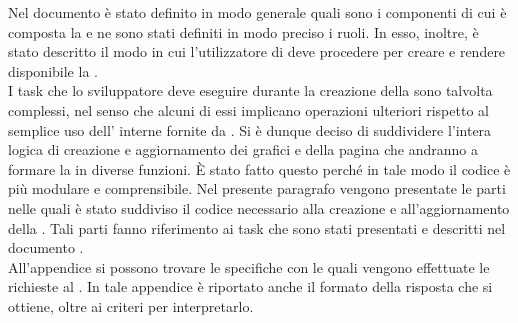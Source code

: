     Nel documento  è stato definito in modo generale quali sono i componenti di cui è composta la  e ne sono stati definiti in modo preciso i ruoli. In esso, inoltre, è stato descritto il modo in cui l'utilizzatore di  deve procedere per creare e rendere disponibile la .\\
    I task che lo sviluppatore deve eseguire durante la creazione della  sono talvolta complessi, nel senso che alcuni di essi implicano operazioni ulteriori rispetto al semplice uso dell'  interne fornite da . Si è dunque deciso di suddividere l'intera logica di creazione e aggiornamento dei grafici e della pagina che andranno a formare la  in diverse funzioni. È stato fatto questo perché in tale modo il codice è più modulare e comprensibile.
        Nel presente paragrafo vengono presentate le parti nelle quali è stato suddiviso il codice necessario alla creazione e all'aggiornamento della . Tali parti fanno riferimento ai task che sono stati presentati e descritti nel documento .\\
        All'appendice  si possono trovare le specifiche con le quali vengono effettuate le richieste al  . In tale appendice è riportato anche il formato della risposta che si ottiene, oltre ai criteri per interpretarlo.

